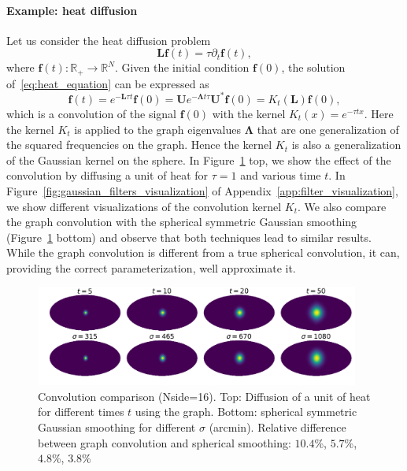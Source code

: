 \documentclass[final,twocolumn,3p,times,authoryear]{elsarticle}
\renewcommand{\b}[1]{{\bm{#1}}}   %
\newcommand{\1}{\b{1}}              %
\newcommand{\0}{\b{0}}              %
\newcommand{\g}[1]{\b{#1}}
\renewcommand{\L}{\b{L}} %
\newcommand{\U}{\b{U}}
\newcommand{\bLambda}{\b{\Lambda}}
\begin{document}
\paragraph{Example: heat diffusion}
Let us consider the heat diffusion problem
\begin{equation} \label{eq:heat_equation}
\L \b{f}(t) = \tau \partial_t \b{f}(t),
\end{equation}
where $\b{f}(t): \mathbb{R}_+ \rightarrow \mathbb{R}^N$. Given the initial condition
$\b{f}(0)$, the solution of~\ref{eq:heat_equation} can be expressed as
\begin{equation}
\b{f}(t) = e^{-\L \tau t} \b{f}(0) = \U e^{-\bLambda t \tau} \U^* \g{f}(0) = K_t(\L) \b{f}(0),
\end{equation}
which is a convolution of the signal $\b{f}(0)$ with the kernel $K_t(x)=e^{-\tau
t x}$. Here the kernel $K_t$ is applied to the graph eigenvalues $\bLambda$ that
are one generalization of the squared frequencies on the graph. Hence the kernel $K_t$ is also a generalization of the
Gaussian kernel on the sphere. In Figure~\ref{fig:gaussian_filters_comparizon} top, we show
the effect of the convolution by diffusing a unit of heat for $\tau=1$ and various
time $t$. In  Figure~\ref{fig:gaussian_filters_visualization} of
Appendix~\ref{app:filter_visualization}, we show different visualizations of the
convolution kernel $K_t$. We also compare the graph convolution with the
spherical symmetric Gaussian smoothing
(Figure~\ref{fig:gaussian_filters_comparizon} bottom) and observe that both
techniques lead to similar results. While the graph convolution is different
from a true spherical convolution, it can, providing the correct
parameterization, well approximate it.

\begin{figure}[!ht]
\centering
\includegraphics[width=0.95\textwidth]{figures/gaussian_filters_sphere.pdf}
\caption{Convolution comparison (Nside=16).
Top: Diffusion of a unit of heat for different times $t$ using the graph.
Bottom: spherical symmetric Gaussian smoothing for different $\sigma$ (arcmin).
Relative difference between graph convolution and spherical smoothing: $10.4$\%, $5.7$\%, $4.8$\%, $3.8$\% }
\label{fig:gaussian_filters_comparizon}
\end{figure}
\end{document}
